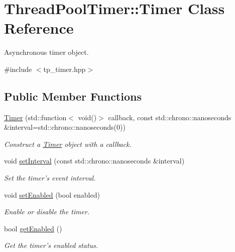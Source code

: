 \hypertarget{classThreadPoolTimer_1_1Timer}{\section{Thread\-Pool\-Timer\-:\-:Timer Class Reference}
\label{classThreadPoolTimer_1_1Timer}
}


Asynchronous timer object.  




{\ttfamily \#include $<$tp\-\_\-timer.\-hpp$>$}

\subsection*{Public Member Functions}
\begin{DoxyCompactItemize}
\item 
\hyperlink{classThreadPoolTimer_1_1Timer_a931fa92e610af4ac53f665471b5516b4}{Timer} (std\-::function$<$ void()$>$ callback, const std\-::chrono\-::nanoseconds \&interval=std\-::chrono\-::nanoseconds(0))
\begin{DoxyCompactList}\small\item\em Construct a \hyperlink{classThreadPoolTimer_1_1Timer}{Timer} object with a callback. \end{DoxyCompactList}\item 
void \hyperlink{classThreadPoolTimer_1_1Timer_a9112e65788529e3230b22dcace7421f7}{set\-Interval} (const std\-::chrono\-::nanoseconds \&interval)
\begin{DoxyCompactList}\small\item\em Set the timer's event interval. \end{DoxyCompactList}\item 
void \hyperlink{classThreadPoolTimer_1_1Timer_aed13ba283b0cd1e83697bc0d553b37d9}{set\-Enabled} (bool enabled)
\begin{DoxyCompactList}\small\item\em Enable or disable the timer. \end{DoxyCompactList}\item 
\hypertarget{classThreadPoolTimer_1_1Timer_ab2543b0d593e885335786d5b2ed81302}{bool \hyperlink{classThreadPoolTimer_1_1Timer_ab2543b0d593e885335786d5b2ed81302}{get\-Enabled} ()}\label{classThreadPoolTimer_1_1Timer_ab2543b0d593e885335786d5b2ed81302}

\begin{DoxyCompactList}\small\item\em Get the timer's enabled status. \end{DoxyCompactList}\end{DoxyCompactItemize}
